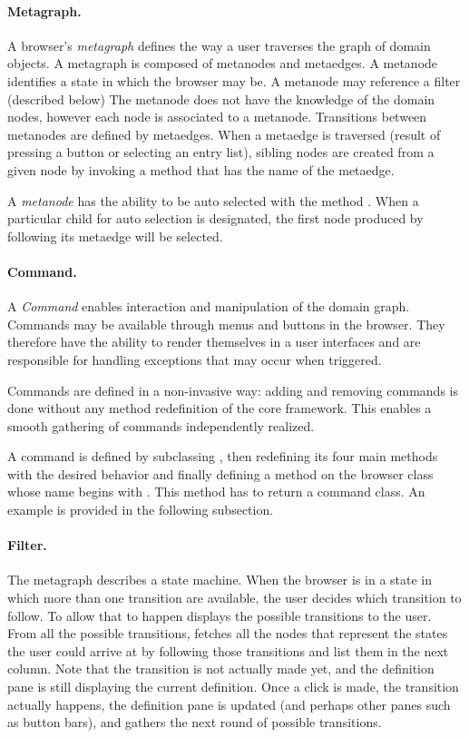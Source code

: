 \documentclass[a4paper,10pt,twoside]{book}
\begin{document}
\paragraph{Metagraph.} A browser's \emph{metagraph} defines the way a user traverses the graph of domain objects. A metagraph is composed of metanodes and metaedges. A metanode identifies a state in which the browser may be. A metanode may reference a filter (described below)
The metanode does not have the knowledge of the domain nodes, however each node is associated to a metanode. Transitions between meta\-nodes are defined by metaedges. When a metaedge is traversed (\ie result of pressing a button or selecting an entry list), sibling nodes are created from a given node by invoking a method that has the name of the metaedge.

A \emph{metanode} has the ability to be auto selected with the method . When a particular child for auto selection is designated, the first node produced by following its metaedge will be selected.


\paragraph{Command.} A \emph{Command} enables interaction and manipulation of the domain graph. Commands may be available through menus and buttons in the browser. They therefore have the ability to render themselves in a user interfaces and are responsible for handling exceptions that may occur when triggered. 

Commands are defined in a non-invasive way: adding and removing commands is done without any method redefinition of the core framework. This enables a smooth gathering of commands independently realized.

A command is defined by subclassing , then redefining its four main methods with the desired behavior and finally defining a method on the browser class whose name begins with . This method has to return a command class. An example is provided in the following subsection.

\paragraph{Filter.} 
The metagraph describes a state machine. When the browser is in a state in which more than one transition are available, the user decides which transition to follow. To allow that to happen \ob displays the possible transitions  to the user. From all the possible transitions, \obf fetches all the nodes that represent the states the user could arrive at by following those transitions and list them in the next column. Note that the transition is not actually made yet, and the definition pane is still displaying the current definition. Once a click is made, the transition  actually happens, the definition pane is updated (and perhaps other panes such as button bars), and \ob gathers the next round of possible transitions.
\end{document}

